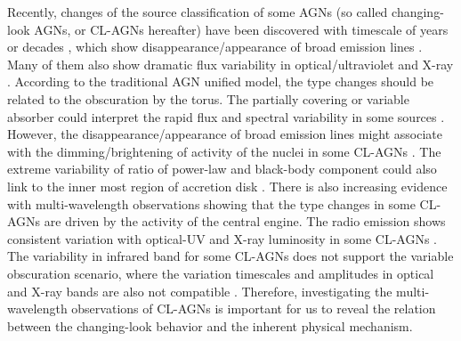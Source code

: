 \documentclass[twocolumn]{aastex63}
\begin{document}
Recently, changes of the source classification of some AGNs (so called changing-look AGNs, or CL-AGNs hereafter) have been discovered  with timescale of years or decades \citep[e.g.][]{2016MNRAS.457..389M, 2016ApJ...826..188R, 2018ApJ...864...27S, 2019ApJ...874....8M,2020MNRAS.491.4925G}, which show disappearance/appearance of broad emission lines \citep[e.g.][]{2016MNRAS.457..389M,2019MNRAS.486..123R}. Many of them also show dramatic flux variability in optical/ultraviolet and X-ray \citep[e.g.][]{2016MNRAS.461.1927P,2017ApJ...846L...7S,2019MNRAS.483L..88P}. According to the traditional AGN unified model, the type changes should be related to the obscuration by the torus. The partially covering or variable absorber could interpret the rapid flux and spectral variability in some sources \citep[e.g.][]{2013MNRAS.436.1615M,2014MNRAS.443.2862A,2015ApJ...815...55R,2018MNRAS.481.2470T}. However, the disappearance/appearance of broad emission lines might associate with the dimming/brightening of activity of the nuclei in some CL-AGNs \citep[e.g.][]{2014ApJ...796..134D,2018MNRAS.480.3898N,2019ApJ...885...44D}. The extreme variability of ratio of power-law and black-body component could also link to the inner most region of accretion disk \citep[e.g.][]{2019ApJ...883...94T,2020ApJ...898L...1R}. There is also increasing evidence with multi-wavelength observations showing that the type changes in some CL-AGNs are driven by the activity of the central engine. The radio emission shows consistent variation with optical-UV and X-ray luminosity in some CL-AGNs \citep[e.g.][]{2016MNRAS.460..304K}. The variability in infrared band for some CL-AGNs \citep[e.g.][]{2017ApJ...846L...7S,2018ApJ...864...27S} does not support the variable obscuration scenario, where the variation timescales and amplitudes in optical and X-ray bands are also not compatible \citep[e.g.][]{2020ApJ...890L..29A}. Therefore, investigating the multi-wavelength observations of CL-AGNs is important for us to reveal the relation between the changing-look behavior and the inherent physical mechanism.
\end{document}
